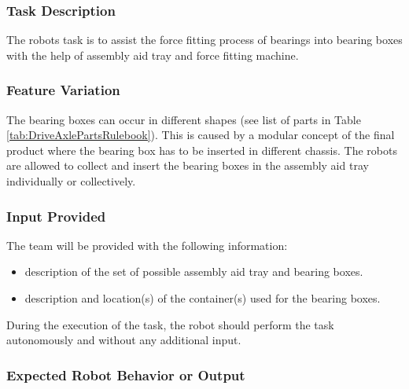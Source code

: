 \subsubsection{Task Description}
\label{sssec:TaskAssemblyAidTrayDescription}

The robots task is to assist the force fitting process of bearings into bearing boxes with the help of assembly aid tray and force fitting machine. 

\subsubsection{Feature Variation}
\label{sssec:TaskAssemblyAidTrayVariation}

The bearing boxes can occur in different shapes (see list of parts in Table \ref{tab:DriveAxlePartsRulebook}). This is caused by a modular concept of the final product where the bearing box has to be inserted in different chassis.
The robots are allowed to collect and insert the bearing boxes in the assembly aid tray individually or collectively.

\subsubsection{Input Provided}
\label{sssec:TaskAssemblyAidTrayInput}

The team will be provided with the following information:

\begin{itemize}
\item description of the set of possible assembly aid tray and bearing boxes.
\item description and location(s) of the container(s) used for the bearing boxes.
\end{itemize}

During the execution of the task, the robot should perform the task autonomously and without any additional input.

\subsubsection{Expected Robot Behavior or Output}
\label{sssec:TaskAssemblyAidTrayOutput}

